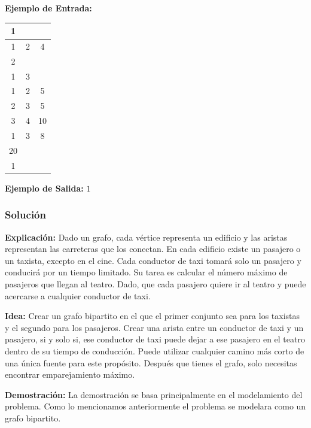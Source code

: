 \documentclass[12pt]{article}
\newcommand{\nl}{\vspace{0.3cm}}
\begin{document}
\nl

\textbf{Ejemplo de Entrada:}

\nl

\begin{tabular}{|c|c|c|}
	\hline 1 &  &  \\ 
	\hline 1 & 2 & 4 \\ 
	\hline 2 &  &  \\ 
	\hline 1 & 3 &  \\ 
	\hline 1 & 2 & 5 \\ 
	\hline 2 & 3 & 5 \\ 
	\hline 3 & 4 & 10 \\ 
	\hline 1 & 3 & 8 \\ 
	\hline 20 &  &  \\ 
	\hline 1 &  &  \\ 
	\hline 
\end{tabular} 

\nl

\textbf{Ejemplo de Salida:} $1$

\nl

\subsubsection{Solución}

\nl

\textbf{Explicación:} Dado un grafo, cada vértice representa un edificio y las aristas representan las carreteras que los conectan. En cada edificio existe un pasajero o un taxista, excepto en el cine. Cada conductor de taxi tomará solo un pasajero y conducirá por un tiempo limitado. Su tarea es calcular el número máximo de pasajeros que llegan al teatro. Dado, que cada pasajero quiere ir al teatro y puede acercarse a cualquier conductor de taxi.

\nl

\textbf{Idea:} Crear un grafo bipartito en el que el primer conjunto sea para los taxistas y el segundo para los pasajeros. Crear una arista entre un conductor de taxi y un pasajero, si y solo si, ese conductor de taxi puede dejar a ese pasajero en el teatro dentro de su tiempo de conducción. Puede utilizar cualquier camino más corto de una única fuente para este propósito. Después que tienes el grafo, solo necesitas encontrar emparejamiento máximo.

\nl

\textbf{Demostración:} La demostración se basa principalmente en el modelamiento del problema. Como lo mencionamos anteriormente el problema se modelara como un grafo bipartito.
\end{document}
